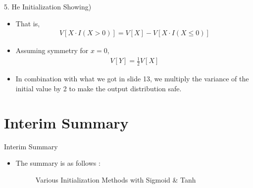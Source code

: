 \documentclass{beamer}
\begin{document}
	
	\begin{frame}{5. He Initialization}
		Showing)
		\begin{itemize}
			\item That is,
			\begin{gather*}
			V[X\cdot I(X>0)] = V[X] - V[X\cdot I(X \le 0)]
			\end{gather*}
			\item Assuming symmetry for $x=0$, 
			\begin{gather*}
			V[Y] = \frac{1}{2} V[X]
			\end{gather*}
			\item In combination with what we got in slide 13, we multiply the variance of the initial value by 2 to make the output distribution safe.
		\end{itemize}
	\end{frame}	


	\section{Interim Summary}
	\begin{frame}{Interim Summary}
		\begin{itemize}
			\item The summary is as follows :
			\vspace{10pt}
			\begin{figure}[h]
				\centering
				\quad
				\caption{Various Initialization Methods with Sigmoid \& Tanh}
				\label{fig:cnnsigmoidtanh}
			\end{figure}
		\end{itemize}
	\end{frame}
\end{document}
